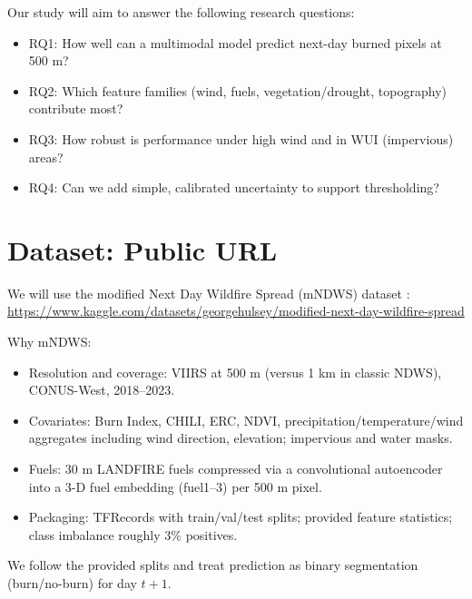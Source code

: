 \documentclass[conference]{IEEEtran}
\begin{document}
Our study will aim to answer the following research questions:
\begin{itemize}
    \item RQ1: How well can a multimodal model predict next-day burned pixels at 500 m?
    \item RQ2: Which feature families (wind, fuels, vegetation/drought, topography) contribute most?
    \item RQ3: How robust is performance under high wind and in WUI (impervious) areas?
    \item RQ4: Can we add simple, calibrated uncertainty to support thresholding?
\end{itemize}

\section{Dataset: Public URL}
We will use the modified Next Day Wildfire Spread (mNDWS) dataset \cite{hulsey2024mndws}: \url{https://www.kaggle.com/datasets/georgehulsey/modified-next-day-wildfire-spread}

Why mNDWS:
\begin{itemize}
    \item Resolution and coverage: VIIRS at 500 m (versus 1 km in classic NDWS), CONUS-West, 2018--2023.
    \item Covariates: Burn Index, CHILI, ERC, NDVI, precipitation/temperature/wind aggregates including wind direction, elevation; impervious and water masks.
    \item Fuels: 30 m LANDFIRE fuels compressed via a convolutional autoencoder into a 3-D fuel embedding (fuel1--3) per 500 m pixel.
    \item Packaging: TFRecords with train/val/test splits; provided feature statistics; class imbalance roughly 3\% positives.
\end{itemize}

We follow the provided splits and treat prediction as binary segmentation (burn/no-burn) for day $t{+}1$.
\end{document}
